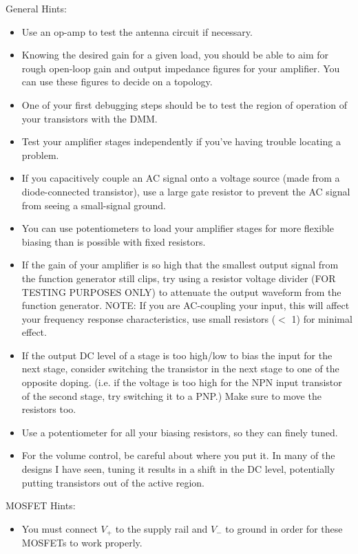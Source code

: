 \documentclass{article}
\begin{document}
General Hints:
\begin{itemize}
  \item Use an op-amp to test the antenna circuit if necessary.
  \item Knowing the desired gain for a given load, you should be able to aim for rough open-loop gain and output impedance figures for your amplifier. You can use these figures to decide on a topology.
  \item One of your first debugging steps should be to test the region of operation of your transistors with the DMM.
  \item Test your amplifier stages independently if you've having trouble locating a problem.
  \item If you capacitively couple an AC signal onto a voltage source (made from a diode-connected transistor), use a large gate resistor to prevent the AC signal from seeing a small-signal ground.
  \item You can use potentiometers to load your amplifier stages for more flexible biasing than is possible with fixed resistors.
  \item If the gain of your amplifier is so high that the smallest output signal from the function generator still clips, try using a resistor voltage divider (FOR TESTING PURPOSES ONLY) to attenuate the output waveform from the function generator. NOTE: If you are AC-coupling your input, this will affect your frequency response characteristics, use small resistors ($<$ \unit{1}{\kilo\ohm}) for minimal effect.
  \item If the output DC level of a stage is too high/low to bias the input for the next stage, consider switching the transistor in the next stage to one of the opposite doping. (i.e. if the voltage is too high for the NPN input transistor  of the second stage, try switching it to a PNP.) Make sure to move the resistors too.
  \item Use a potentiometer for all your biasing resistors, so they can finely tuned.
  \item For the volume control, be careful about where you put it. In many of the designs I have seen, tuning it results in a shift in the DC level, potentially putting transistors out of the active region.
\end{itemize}
MOSFET Hints:
\begin{itemize}
  \item You must connect $V_+$ to the supply rail and $V_-$ to ground in order for these MOSFETs to work properly.
\end{itemize}
\end{document}
